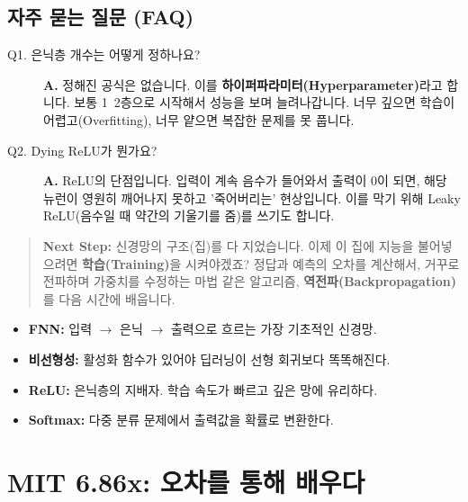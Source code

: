 \documentclass[11pt,a4paper]{book}
\theoremstyle{definition}
\begin{document}
\section{자주 묻는 질문 (FAQ)}

\begin{description}
    \item[Q1. 은닉층 개수는 어떻게 정하나요?]
    \textbf{A.} 정해진 공식은 없습니다. 이를 \textbf{하이퍼파라미터(Hyperparameter)}라고 합니다. 보통 1~2층으로 시작해서 성능을 보며 늘려나갑니다. 너무 깊으면 학습이 어렵고(Overfitting), 너무 얕으면 복잡한 문제를 못 풉니다.
    
    \item[Q2. Dying ReLU가 뭔가요?]
    \textbf{A.} ReLU의 단점입니다. 입력이 계속 음수가 들어와서 출력이 0이 되면, 해당 뉴런이 영원히 깨어나지 못하고 '죽어버리는' 현상입니다. 이를 막기 위해 Leaky ReLU(음수일 때 약간의 기울기를 줌)를 쓰기도 합니다.
\end{description}

\vspace{1cm}
\begin{quote}
\textbf{Next Step:} 신경망의 구조(집)를 다 지었습니다. 이제 이 집에 지능을 불어넣으려면 \textbf{학습(Training)}을 시켜야겠죠? 정답과 예측의 오차를 계산해서, 거꾸로 전파하며 가중치를 수정하는 마법 같은 알고리즘, \textbf{역전파(Backpropagation)}를 다음 시간에 배웁니다.
\end{quote}

\begin{summarybox}[title={Unit 3 (Part A) 핵심 요약}]
\begin{itemize}
    \item \textbf{FNN:} 입력 $\to$ 은닉 $\to$ 출력으로 흐르는 가장 기초적인 신경망.
    \item \textbf{비선형성:} 활성화 함수가 있어야 딥러닝이 선형 회귀보다 똑똑해진다.
    \item \textbf{ReLU:} 은닉층의 지배자. 학습 속도가 빠르고 깊은 망에 유리하다.
    \item \textbf{Softmax:} 다중 분류 문제에서 출력값을 확률로 변환한다.
\end{itemize}
\end{summarybox}


\chapter{MIT 6.86x: 오차를 통해 배우다}
\label{ch:lecture8}
\end{document}
